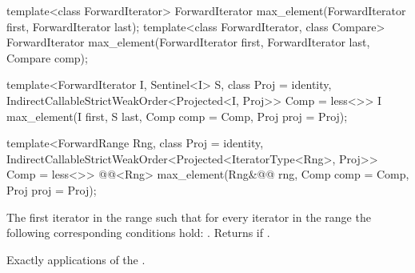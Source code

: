 %
\begin{removedblock}
\begin{itemdecl}
template<class ForwardIterator>
  ForwardIterator max_element(ForwardIterator first, ForwardIterator last);
template<class ForwardIterator, class Compare>
  ForwardIterator max_element(ForwardIterator first, ForwardIterator last,
                            Compare comp);
\end{itemdecl}
\end{removedblock}
\begin{addedblock}
\begin{itemdecl}
template<ForwardIterator I, Sentinel<I> S, class Proj = identity,
    IndirectCallableStrictWeakOrder<Projected<I, Proj>> Comp = less<>>
  I max_element(I first, S last, Comp comp = Comp{}, Proj proj = Proj{});

template<ForwardRange Rng, class Proj = identity,
    IndirectCallableStrictWeakOrder<Projected<IteratorType<Rng>, Proj>> Comp = less<>>
  @@<Rng>
    max_element(Rng&@\newtxt{\&}@ rng, Comp comp = Comp{}, Proj proj = Proj{});
\end{itemdecl}
\end{addedblock}

\begin{itemdescr}
\pnum
\returns
The first iterator
in the range
such that for every iterator
in the range
the following corresponding conditions hold:
.
Returns
if
.

\pnum
\complexity
Exactly
applications of the .
\end{itemdescr}

